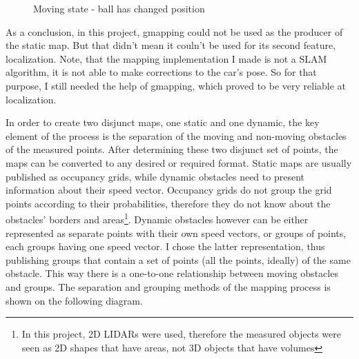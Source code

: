 \begin{figure}[!ht]
\centering
{}
\caption{Moving state - ball has changed position}
\label{gmapping_drawback_after_move}
\end{figure}

As a conclusion, in this project, gmapping could not be used as the producer of the static map. But that didn't mean it couln't be used for its second feature, localization. Note, that the mapping implementation I made is not a SLAM algorithm, it is not able to make corrections to the car's pose. So for that purpose, I still needed the help of gmapping, which proved to be very reliable at localization.

In order to create two disjunct maps, one static and one dynamic, the key element of the process is the separation of the moving and non-moving obstacles of the measured points. After determining these two disjunct set of points, the maps can be converted to any desired or required format. Static maps are usually published as occupancy grids, while dynamic obstacles need to present information about their speed vector. Occupancy grids do not group the grid points according to their probabilities, therefore they do not know about the obstacles' borders and areas\footnote{In this project, 2D LIDARs were used, therefore the measured objects were seen as 2D shapes that have areas, not 3D objects that have volumes}. Dynamic obstacles however can be either represented as separate points with their own speed vectors, or groups of points, each groups having one speed vector. I chose the latter representation, thus publishing groups that contain a set of points (all the points, ideally) of the same obstacle. This way there is a one-to-one relationship between moving obstacles and groups. The separation and grouping methods of the mapping process is shown on the following diagram.

